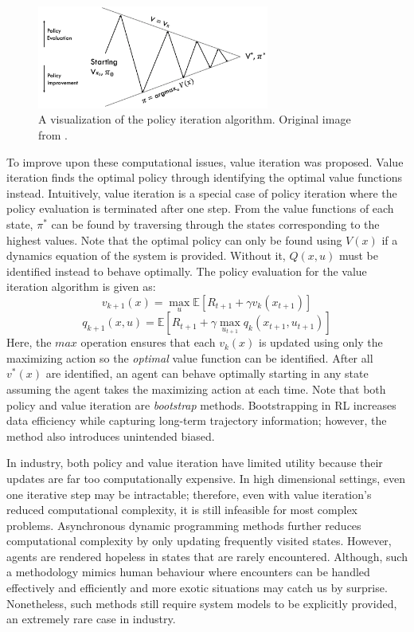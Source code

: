 \begin{figure}[H]
    \centering
    \includegraphics[width=0.68\textwidth]{images/ch1/policy_iteration.jpeg}
    \caption{A visualization of the policy iteration algorithm. Original image from \cite{silver_class}.}
    \label{fig:policy_iteration}
\end{figure}   

To improve upon these computational issues, value iteration was proposed.  Value iteration finds the optimal policy through identifying the optimal value functions instead. Intuitively, value iteration is a special case of policy iteration where the policy evaluation is terminated after one step.  From the value functions of each state, $\pi^*$ can be found by traversing through the states corresponding to the highest values. Note that the optimal policy can only be found using $V(x)$ if a dynamics equation of the system is provided. Without it, $Q(x, u)$ must be identified instead to behave optimally. The policy evaluation for the value iteration algorithm is given as:
\begin{equation}
    v_{k+1}(x) = \max_u \mathbb{E}[R_{t+1} + \gamma v_k(x_{t+1})]
\end{equation}
\begin{equation}
    q_{k+1}(x, u) = \mathbb{E}[R_{t+1} + \gamma \max_{u_{t+1}} q_k(x_{t+1}, u_{t+1})]
\end{equation}
Here, the $max$ operation ensures that each $v_k(x)$ is updated using only the maximizing action so the \textit{optimal} value function can be identified. After all $v^*(x)$ are identified, an agent can behave optimally starting in any state assuming the agent takes the maximizing action at each time. Note that both policy and value iteration are \textit{bootstrap} methods. Bootstrapping in RL increases data efficiency while capturing long-term trajectory information; however, the method also introduces unintended biased. 

In industry, both policy and value iteration have limited utility because their updates are far too computationally expensive. In high dimensional settings, even one iterative step may be intractable; therefore, even with value iteration's reduced computational complexity, it is still infeasible for most complex problems. Asynchronous dynamic programming methods further reduces computational complexity by only updating frequently visited states. However, agents are rendered hopeless in states that are rarely encountered. Although, such a methodology mimics human behaviour where encounters can be handled effectively and efficiently and more exotic situations may catch us by surprise. Nonetheless, such methods still require system models to be explicitly provided, an extremely rare case in industry.

